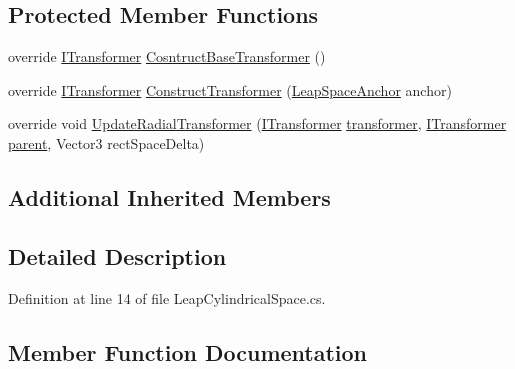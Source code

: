 \subsection*{Protected Member Functions}
\begin{DoxyCompactItemize}
\item 
override \mbox{\hyperlink{interface_leap_1_1_unity_1_1_space_1_1_i_transformer}{I\+Transformer}} \mbox{\hyperlink{class_leap_1_1_unity_1_1_space_1_1_leap_cylindrical_space_a65ae2afb61d3f9fe727a5a08dcc6a2ec}{Cosntruct\+Base\+Transformer}} ()
\item 
override \mbox{\hyperlink{interface_leap_1_1_unity_1_1_space_1_1_i_transformer}{I\+Transformer}} \mbox{\hyperlink{class_leap_1_1_unity_1_1_space_1_1_leap_cylindrical_space_ae0d1e2b264077a2f5075a239903a91d9}{Construct\+Transformer}} (\mbox{\hyperlink{class_leap_1_1_unity_1_1_space_1_1_leap_space_anchor}{Leap\+Space\+Anchor}} anchor)
\item 
override void \mbox{\hyperlink{class_leap_1_1_unity_1_1_space_1_1_leap_cylindrical_space_aaf93c86d6ae53e212049898f2bb2a2cf}{Update\+Radial\+Transformer}} (\mbox{\hyperlink{interface_leap_1_1_unity_1_1_space_1_1_i_transformer}{I\+Transformer}} \mbox{\hyperlink{class_leap_1_1_unity_1_1_space_1_1_leap_space_anchor_a6f98d35d75f83e2ff2c978715520c836}{transformer}}, \mbox{\hyperlink{interface_leap_1_1_unity_1_1_space_1_1_i_transformer}{I\+Transformer}} \mbox{\hyperlink{class_leap_1_1_unity_1_1_space_1_1_leap_space_anchor_a8df76f5c9ba6a0f169880fec6bca557b}{parent}}, Vector3 rect\+Space\+Delta)
\end{DoxyCompactItemize}
\subsection*{Additional Inherited Members}


\subsection{Detailed Description}


Definition at line 14 of file Leap\+Cylindrical\+Space.\+cs.



\subsection{Member Function Documentation}
\mbox{\label{class_leap_1_1_unity_1_1_space_1_1_leap_cylindrical_space_ae0d1e2b264077a2f5075a239903a91d9}} 
